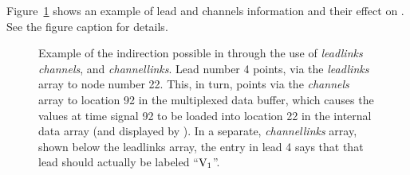 Figure~\ref{fig:indirec} shows an example of lead and channels
information and their effect on \map{}.  See the figure caption for
details. 

\begin{figure}[htb]
  \centerline{}
  \caption{Example of the indirection possible in \map{} through the use of
  {\em leadlinks\/} {\em channels}, and {\em channellinks}.
  Lead number 4 points, via the {\em leadlinks\/} array to node number 22.
  This, in turn, points via the {\em channels\/} array to location 92 in
  the multiplexed data buffer, which causes the values at time signal 92 to be
  loaded into location 22 in the internal data array (and displayed by
  \map{}).  In a separate, \emph{channellinks} array, shown below the leadlinks
  array, the entry in lead 4 says that that lead should actually be
  labeled ``${\rm V_{1}}$''. } 
  \label{fig:indirec}
\end{figure}

